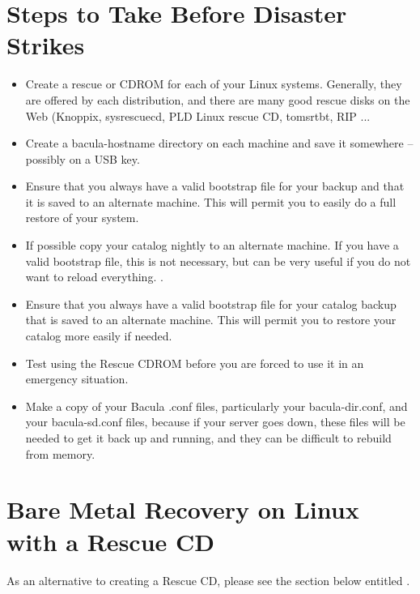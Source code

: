 \label{steps1}
\section{Steps to Take Before Disaster Strikes}

\begin{itemize}
\item Create a rescue or CDROM for each of your Linux systems. Generally,
   they are offered by each distribution, and there are many good 
   rescue disks on the Web (Knoppix, sysrescuecd, PLD Linux rescue CD,
   tomsrtbt, RIP ...

\item Create a bacula-hostname directory on 
   each machine and save it somewhere -- possibly on a USB key.
\item Ensure that you always have a valid bootstrap file for your backup and 
   that it is saved to an alternate machine.  This will permit you to
   easily do a full restore of your system.
\item If possible copy your catalog nightly to an alternate machine.  If you
   have a valid bootstrap file, this is not necessary, but  can be very useful if
   you do not want to reload everything. .  
\item Ensure that you always have a valid bootstrap file for your  catalog
   backup that is saved to an alternate machine. This will  permit you to restore
   your catalog more easily if needed.  
\item Test using the Rescue CDROM before you are forced to use it in
   an emergency situation.
\item Make a copy of your Bacula .conf files, particularly your
   bacula-dir.conf, and your bacula-sd.conf files, because if your server
   goes down, these files will be needed to get it back up and running,
   and they can be difficult to rebuild from memory.
\end{itemize}

\label{rescueCDROM}
\section{Bare Metal Recovery on Linux with a Rescue CD}

As an alternative to creating a Rescue CD, please see the
section below entitled .


